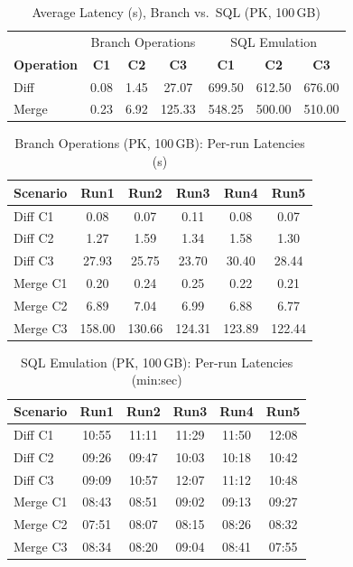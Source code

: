 \documentclass[sigconf,nonacm]{acmart} %
\begin{document}
\begin{table}[h]
  \centering
  \caption{Average Latency (s), Branch vs.\ SQL (PK, 100\,GB)}
  \label{tab:branch-sql-avg}
  \begin{tabular}{lcccccc}
    \toprule
    & \multicolumn{3}{c}{Branch Operations} & \multicolumn{3}{c}{SQL Emulation} \\
    \cmidrule(lr){2-4} \cmidrule(lr){5-7}
    \textbf{Operation} & \textbf{C1} & \textbf{C2} & \textbf{C3} & \textbf{C1} & \textbf{C2} & \textbf{C3} \\
    \midrule
    Diff  & 0.08 & 1.45 & 27.07 & 699.50 & 612.50 & 676.00 \\
    Merge & 0.23 & 6.92 & 125.33 & 548.25 & 500.00 & 510.00 \\
    \bottomrule
  \end{tabular}
\end{table}

\begin{table}[h]
  \centering
  \caption{Branch Operations (PK, 100\,GB): Per-run Latencies (s)}
  \label{tab:branch-sql-runs-branch}
  \begin{tabular}{lccccc}
    \toprule
    Scenario & Run1 & Run2 & Run3 & Run4 & Run5 \\
    \midrule
    Diff C1  & 0.08 & 0.07 & 0.11 & 0.08 & 0.07 \\
    Diff C2  & 1.27 & 1.59 & 1.34 & 1.58 & 1.30 \\
    Diff C3  & 27.93 & 25.75 & 23.70 & 30.40 & 28.44 \\
    Merge C1 & 0.20 & 0.24 & 0.25 & 0.22 & 0.21 \\
    Merge C2 & 6.89 & 7.04 & 6.99 & 6.88 & 6.77 \\
    Merge C3 & 158.00 & 130.66 & 124.31 & 123.89 & 122.44 \\
    \bottomrule
  \end{tabular}
\end{table}

\begin{table}[h]
  \centering
  \caption{SQL Emulation (PK, 100\,GB): Per-run Latencies (min:sec)}
  \label{tab:branch-sql-runs-sql}
  \begin{tabular}{lccccc}
    \toprule
    Scenario & Run1 & Run2 & Run3 & Run4 & Run5 \\
    \midrule
    Diff C1  & 10:55 & 11:11 & 11:29 & 11:50 & 12:08 \\
    Diff C2  & 09:26 & 09:47 & 10:03 & 10:18 & 10:42 \\
    Diff C3  & 09:09 & 10:57 & 12:07 & 11:12 & 10:48 \\
    Merge C1 & 08:43 & 08:51 & 09:02 & 09:13 & 09:27 \\
    Merge C2 & 07:51 & 08:07 & 08:15 & 08:26 & 08:32 \\
    Merge C3 & 08:34 & 08:20 & 09:04 & 08:41 & 07:55 \\
    \bottomrule
  \end{tabular}
\end{table}
\end{document}
